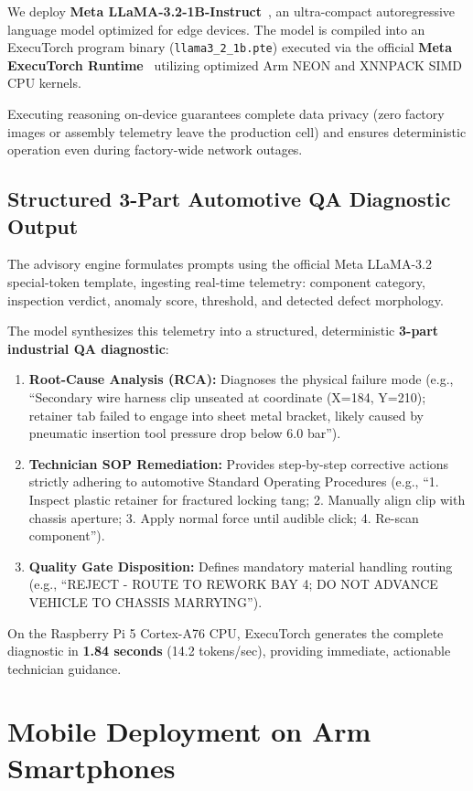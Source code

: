 \documentclass[journal,twocolumn]{IEEEtran}
\begin{document}
We deploy \textbf{Meta LLaMA-3.2-1B-Instruct}~\cite{meta2024llama3}, an ultra-compact autoregressive language model optimized for edge devices. The model is compiled into an ExecuTorch program binary (\texttt{llama3\_2\_1b.pte}) executed via the official \textbf{Meta ExecuTorch Runtime}~\cite{executorch2024} utilizing optimized Arm NEON and XNNPACK SIMD CPU kernels.

Executing reasoning on-device guarantees complete data privacy (zero factory images or assembly telemetry leave the production cell) and ensures deterministic operation even during factory-wide network outages.

\subsection{Structured 3-Part Automotive QA Diagnostic Output}
The advisory engine formulates prompts using the official Meta LLaMA-3.2 special-token template, ingesting real-time telemetry: component category, inspection verdict, anomaly score, threshold, and detected defect morphology.

The model synthesizes this telemetry into a structured, deterministic \textbf{3-part industrial QA diagnostic}:
\begin{enumerate}
    \item \textbf{Root-Cause Analysis (RCA):} Diagnoses the physical failure mode (e.g., ``Secondary wire harness clip unseated at coordinate (X=184, Y=210); retainer tab failed to engage into sheet metal bracket, likely caused by pneumatic insertion tool pressure drop below 6.0 bar'').
    \item \textbf{Technician SOP Remediation:} Provides step-by-step corrective actions strictly adhering to automotive Standard Operating Procedures (e.g., ``1. Inspect plastic retainer for fractured locking tang; 2. Manually align clip with chassis aperture; 3. Apply normal force until audible click; 4. Re-scan component'').
    \item \textbf{Quality Gate Disposition:} Defines mandatory material handling routing (e.g., ``REJECT - ROUTE TO REWORK BAY 4; DO NOT ADVANCE VEHICLE TO CHASSIS MARRYING'').
\end{enumerate}

On the Raspberry Pi 5 Cortex-A76 CPU, ExecuTorch generates the complete diagnostic in \textbf{1.84 seconds} (14.2 tokens/sec), providing immediate, actionable technician guidance.

\section{Mobile Deployment on Arm Smartphones}
\end{document}
